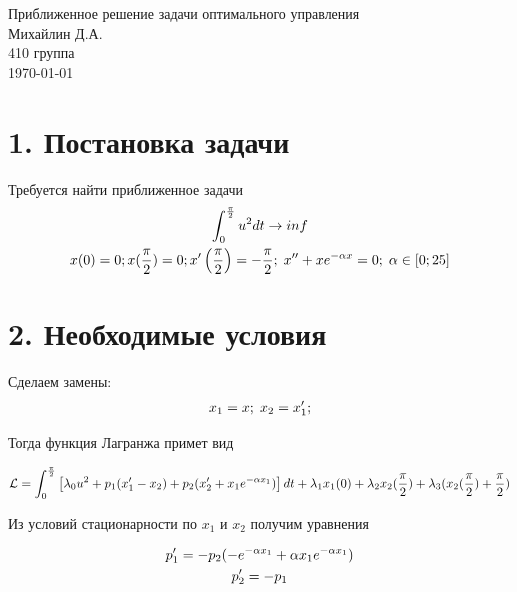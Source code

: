 \documentclass[titlepage]{article}
\def\l{\left}
\def\r{\right}
\begin{document}
 

\newtheorem{theorem}{Теорема}
\newtheorem{lemma}{Лемма}
\newtheorem{definition}{Определение}
\renewcommand{\proofname}{Доказательство}

\begin{center}
\hfill \break
\hfill \break
\hfill \break
\LARGE Приближенное решение задачи оптимального управления \\
\hfill \break
\large Михайлин Д.А. \\
\large 410 группа \\
\hfill \break
\today \\

\end{center}

\section{1. Постановка задачи}
Требуется найти приближенное задачи
\begin{gather*}
	\notag \int_{0}^{\frac{\pi}{2}}u^2dt \rightarrow inf \\
	\notag x(0) = 0; x(\frac{\pi}{2}) = 0; x'\l(\frac{\pi}{2}\r) = -\frac{\pi}{2}; \; x'' + xe^{-\alpha x} = 0; \; \alpha \in \left[0;25\right]\\
\end{gather*}

\section{2. Необходимые условия}
Сделаем замены:
\begin{gather*}
	\notag x_1 = x; \; x_2 = x_1'; \\
\end{gather*}

Тогда функция Лагранжа примет вид

\begin{gather*}
	\notag \mathcal{L} = \int_{0}^{\frac{\pi}{2}}\left[\lambda_0 u^2 + p_1 (x_1' - x_2) + p_2 (x_2' + x_1 e^{-\alpha x_1})\right] dt + \lambda_1 x_1(0) + \lambda_2 x_2(\frac{\pi}{2}) + \lambda_3(x_2(\frac{\pi}{2}) + \frac{\pi}{2}) \\
\end{gather*}

Из условий стационарности по $x_1$ и $x_2$ получим уравнения

\begin{gather*}
	\notag p_1' = -p_2 (-e^{-\alpha x_1} + \alpha x_1 e^{-\alpha x_1}) \\
	\notag p_2' = -p_1  \\
\end{gather*}
\end{document}
